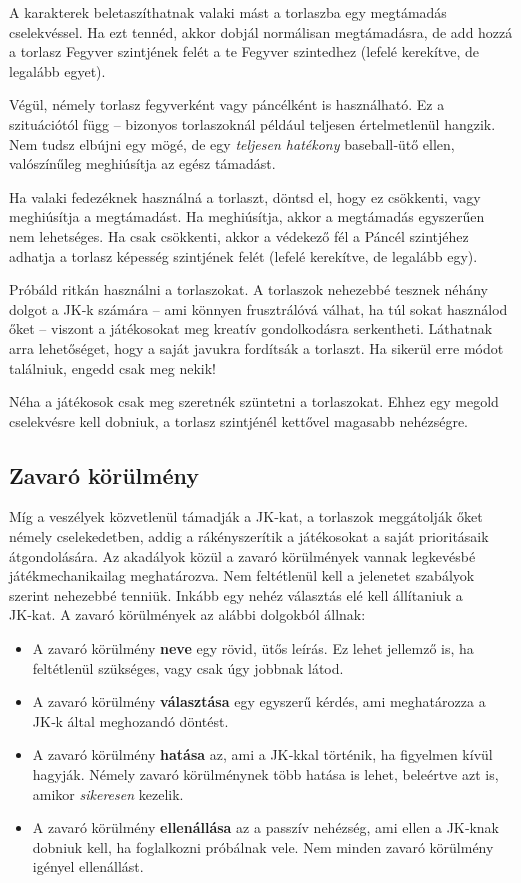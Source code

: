 A karakterek beletaszíthatnak valaki mást a torlaszba egy megtámadás cselekvéssel. Ha ezt tennéd, akkor dobjál normálisan megtámadásra, de add hozzá a torlasz Fegyver szintjének felét a te Fegyver szintedhez (lefelé kerekítve, de legalább egyet).

Végül, némely torlasz fegyverként vagy páncélként is használható. Ez a szituációtól függ – bizonyos torlaszoknál például teljesen értelmetlenül hangzik. Nem tudsz elbújni egy  mögé, de egy  \emph{teljesen hatékony} baseball‑ütő ellen, valószínűleg meghiúsítja az egész támadást.

Ha valaki fedezéknek használná a torlaszt, döntsd el, hogy ez csökkenti, vagy meghiúsítja a megtámadást. Ha meghiúsítja, akkor a megtámadás egyszerűen nem lehetséges. Ha csak csökkenti, akkor a védekező fél a Páncél szintjéhez adhatja a torlasz képesség szintjének felét (lefelé kerekítve, de legalább egy).

Próbáld ritkán használni a torlaszokat. A torlaszok nehezebbé tesznek néhány dolgot a JK‑k számára – ami könnyen frusztrálóvá válhat, ha túl sokat használod őket – viszont a játékosokat meg kreatív gondolkodásra serkentheti. Láthatnak arra lehetőséget, hogy a saját javukra fordítsák a torlaszt. Ha sikerül erre módot találniuk, engedd csak meg nekik!

Néha a játékosok csak meg szeretnék szüntetni a torlaszokat. Ehhez egy megold cselekvésre kell dobniuk, a torlasz szintjénél kettővel magasabb nehézségre.

\newpage

\subsection{Zavaró körülmény}

Míg a veszélyek közvetlenül támadják a JK‑kat, a torlaszok meggátolják őket némely cselekedetben, addig a  rákényszerítik a játékosokat a saját prioritásaik átgondolására. Az akadályok közül a zavaró körülmények vannak legkevésbé játékmechanikailag meghatározva. Nem feltétlenül kell a jelenetet szabályok szerint nehezebbé tenniük. Inkább egy nehéz választás elé kell állítaniuk a JK‑kat. A zavaró körülmények az alábbi dolgokból állnak:

\begin{itemize}
    \item A zavaró körülmény \textbf{neve} egy rövid, ütős leírás. Ez lehet jellemző is, ha feltétlenül szükséges, vagy csak úgy jobbnak látod.
    \item A zavaró körülmény \textbf{választása} egy egyszerű kérdés, ami meghatározza a JK‑k által meghozandó döntést.
    \item A zavaró körülmény \textbf{hatása} az, ami a JK‑kkal történik, ha figyelmen kívül hagyják. Némely zavaró körülménynek több hatása is lehet, beleértve azt is, amikor \emph{sikeresen} kezelik.
    \item A zavaró körülmény \textbf{ellenállása} az a passzív nehézség, ami ellen a JK‑knak dobniuk kell, ha foglalkozni próbálnak vele. Nem minden zavaró körülmény igényel ellenállást.
\end{itemize}

